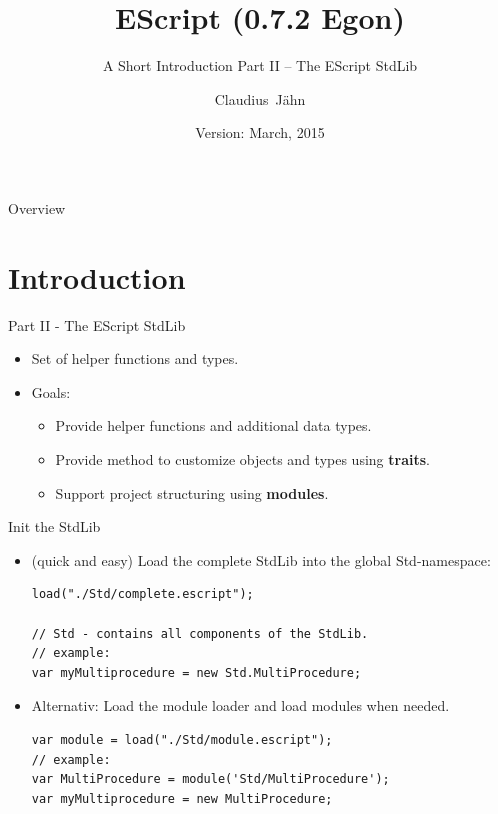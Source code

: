 \documentclass[ucs,9pt]{beamer}
\title{EScript (0.7.2 Egon)}
\subtitle{A Short Introduction Part II -- The EScript StdLib}
\author{Claudius~Jähn}
\date{Version: March, 2015}
\begin{document}
\lstset{
	language=EScript,
	showstringspaces=false,
	tabsize=4,
	basicstyle=\ttfamily,
}
\maketitle


\begin{frame}{Overview}
\tableofcontents
\end{frame}

\section{Introduction}
\begin{frame}{Part II - The EScript StdLib}
\begin{itemize}
		\item Set of helper functions and types.
		\item Goals: 
		\begin{itemize}
			\item Provide helper functions and additional data types.
			\item Provide method to customize objects and types using \textbf{traits}.
			\item Support project structuring using \textbf{modules}.
		\end{itemize}
\end{itemize}
\end{frame}



\begin{frame}[fragile]{Init the StdLib}
\begin{itemize}
		\item (quick and easy) Load the complete StdLib into the global Std-namespace:
\begin{lstlisting}
load("./Std/complete.escript");

// Std - contains all components of the StdLib.
// example:
var myMultiprocedure = new Std.MultiProcedure;
\end{lstlisting}
		\item Alternativ: Load the module loader and load modules when needed.
\begin{lstlisting}
var module = load("./Std/module.escript");
// example:
var MultiProcedure = module('Std/MultiProcedure');
var myMultiprocedure = new MultiProcedure;
\end{lstlisting}
\end{itemize}
\end{frame}
\end{document}
